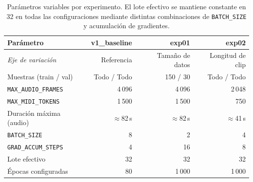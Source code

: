 \begin{table}[H]
    \centering
    \renewcommand{\arraystretch}{1.3}
    \begin{tabular}{l r r r}
        \hline
        \textbf{Parámetro}
            & \textbf{v1\_baseline}
            & \textbf{exp01}
            & \textbf{exp02} \\
        \hline
        \textit{Eje de variación}
            & Referencia
            & Tamaño de datos
            & Longitud de clip \\
        Muestras (train / val)
            & Todo / Todo
            & 150 / 30
            & Todo / Todo \\
        \texttt{MAX\_AUDIO\_FRAMES}
            & 4\,096
            & 4\,096
            & 2\,048 \\
        \texttt{MAX\_MIDI\_TOKENS}
            & 1\,500
            & 1\,500
            & 750 \\
        Duración máxima (audio)
            & $\approx$82\,s
            & $\approx$82\,s
            & $\approx$41\,s \\
        \texttt{BATCH\_SIZE}
            & 8
            & 2
            & 4 \\
        \texttt{GRAD\_ACCUM\_STEPS}
            & 4
            & 16
            & 8 \\
        Lote efectivo
            & 32
            & 32
            & 32 \\
        Épocas configuradas
            & 80
            & 1\,000
            & 1\,000 \\
        \hline
    \end{tabular}
    \caption{Parámetros variables por experimento. El lote efectivo
    se mantiene constante en 32 en todas las configuraciones mediante
    distintas combinaciones de \texttt{BATCH\_SIZE} y acumulación de
    gradientes.}
    \label{tab:configuraciones_experimentos}
\end{table}

